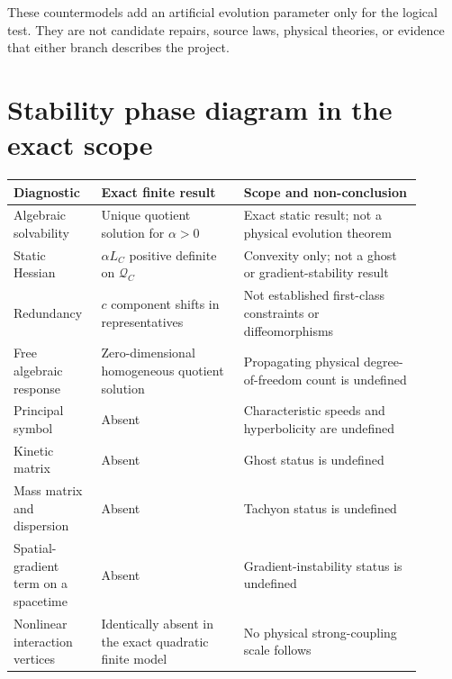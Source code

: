 \documentclass[11pt]{article}
\newcommand{\Qspace}{\mathcal Q_C}
\begin{document}
These countermodels add an artificial evolution parameter only for the
logical test.  They are not candidate repairs, source laws, physical
theories, or evidence that either branch describes the project.

\section{Stability phase diagram in the exact scope}

\begin{longtable}{p{0.18\linewidth}p{0.32\linewidth}p{0.40\linewidth}}
\toprule
Diagnostic & Exact finite result & Scope and non-conclusion\\
\midrule
Algebraic solvability &
Unique quotient solution for \(\alpha>0\) &
Exact static result; not a physical evolution theorem\\
Static Hessian &
\(\alpha L_C\) positive definite on \(\Qspace\) &
Convexity only; not a ghost or gradient-stability result\\
Redundancy &
\(c\) component shifts in representatives &
Not established first-class constraints or diffeomorphisms\\
Free algebraic response &
Zero-dimensional homogeneous quotient solution &
Propagating physical degree-of-freedom count is undefined\\
Principal symbol &
Absent &
Characteristic speeds and hyperbolicity are undefined\\
Kinetic matrix &
Absent &
Ghost status is undefined\\
Mass matrix and dispersion &
Absent &
Tachyon status is undefined\\
Spatial-gradient term on a spacetime &
Absent &
Gradient-instability status is undefined\\
Nonlinear interaction vertices &
Identically absent in the exact quadratic finite model &
No physical strong-coupling scale follows\\
\bottomrule
\end{longtable}
\end{document}
